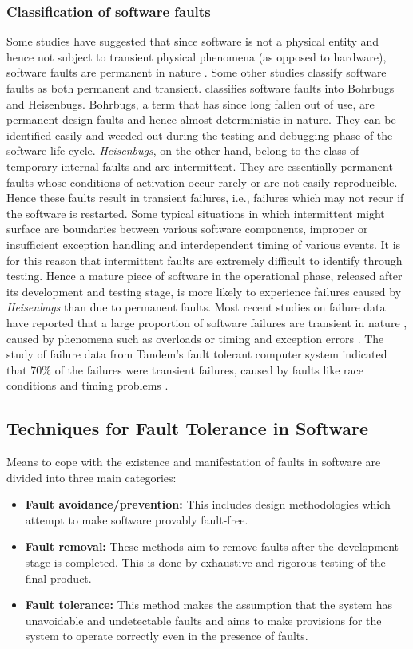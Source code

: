 \documentclass[a4paper, 11pt]{article}
\begin{document}
\subsubsection{Classification of software faults}
Some studies have suggested that since software is not a physical entity and hence not subject to transient physical phenomena (as opposed to hardware), software faults are permanent in nature \citep{huang1994two}. Some other studies classify software faults as both permanent and transient. \citet{gray1986computers} classifies software faults into Bohrbugs and Heisenbugs. Bohrbugs, a term that has since long fallen out of use, are permanent design faults and hence almost deterministic in nature. They can be identified easily and weeded out during the testing and debugging phase of the software life cycle. \emph{Heisenbugs}, on the other hand, belong to the class of temporary internal faults and are intermittent. They are essentially permanent faults whose conditions of activation occur rarely or are not easily reproducible. Hence these faults result in transient failures, i.e., failures which may not recur if the software is restarted. Some typical situations in which intermittent might surface are boundaries between various software components, improper or insufficient exception handling and interdependent timing of various events. It is for this reason that intermittent faults are extremely difficult to identify through testing. Hence a mature piece of software in the operational phase, released after its development and testing stage, is more likely to experience failures caused by \emph{Heisenbugs} than due to permanent faults. Most recent studies on failure data have reported that a large proportion of software failures are transient in nature \citep{gray1990census}, caused by phenomena such as overloads or timing and exception errors \citep{chillarege1995measurement}. The study of failure data from Tandem's fault tolerant computer system indicated that 70\% of the failures were transient failures, caused by faults like race conditions and timing problems \citep{lee1995software}.

\subsection{Techniques for Fault Tolerance in Software}
Means to cope with the existence and manifestation of faults in software are divided into three main categories:

\begin{itemize}
\item \textbf{Fault avoidance/prevention:} This includes design methodologies which attempt to make software provably fault-free.
\item \textbf{Fault removal:} These methods aim to remove faults after the development stage is completed. This is done by exhaustive and rigorous testing of the final product.
\item \textbf{Fault tolerance:} This method makes the assumption that the system has unavoidable and undetectable faults and aims to make provisions for the system to operate correctly even in the presence of faults.
\end{itemize}
\end{document}

